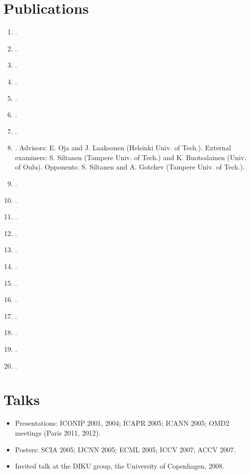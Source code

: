 \documentclass[a4paper,11pt]{article}
\begin{document}
\section{Publications}
\label{sect:pubs}
%
\begin{enumerate}
\item {}.
\item {}.
\item {}.
\item {}.
\item {}.
\item {}.
\item {}.
\item {}.
Advisors: E. Oja and J. Laaksonen (Helsinki Univ. of Tech.). External examiners: S. Siltanen (Tampere Univ. of Tech.) 
and K. Ruotsalainen (Univ. of Oulu). Opponents: S. Siltanen and A. Gotchev (Tampere Univ. of Tech.).
\item {}.
\item {}.
\item {}.
\item {}.
\item {}.
\item {}.
\item {}.
\item {}.
\item {}.
\item {}.
\item {}.
\item {}.
\end{enumerate}

%
\section{Talks}
%
\begin{itemize}
\small
    \item Presentations: ICONIP 2001, 2004; ICAPR 2005; ICANN 2005; OMD2 meetings (Paris 2011, 2012).
    \item Posters: SCIA 2005; IJCNN 2005; ECML 2005; ICCV 2007; ACCV 2007.
    \item Invited talk at the DIKU group, the University of Copenhagen, 2008.
\end{itemize}
%
\end{document}
